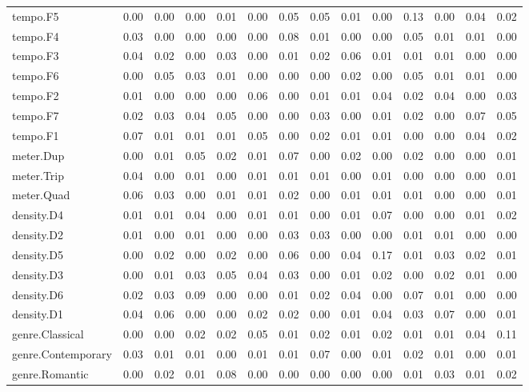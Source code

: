 \documentclass[
]{article}
\newenvironment{lltable}{\begin{landscape}\begin{center}\begin{ThreePartTable}}{\end{ThreePartTable}\end{center}\end{landscape}}
\begin{document}
\begin{lltable}
{\begin{longtable}{llllllllllllll}
tempo.F5 & 0.00 & 0.00 & 0.00 & 0.01 & 0.00 & 0.05 & 0.05 & 0.01 & 0.00 & 0.13 & 0.00 & 0.04 & 0.02\\
tempo.F4 & 0.03 & 0.00 & 0.00 & 0.00 & 0.00 & 0.08 & 0.01 & 0.00 & 0.00 & 0.05 & 0.01 & 0.01 & 0.00\\
tempo.F3 & 0.04 & 0.02 & 0.00 & 0.03 & 0.00 & 0.01 & 0.02 & 0.06 & 0.01 & 0.01 & 0.01 & 0.00 & 0.00\\
tempo.F6 & 0.00 & 0.05 & 0.03 & 0.01 & 0.00 & 0.00 & 0.00 & 0.02 & 0.00 & 0.05 & 0.01 & 0.01 & 0.00\\
tempo.F2 & 0.01 & 0.00 & 0.00 & 0.00 & 0.06 & 0.00 & 0.01 & 0.01 & 0.04 & 0.02 & 0.04 & 0.00 & 0.03\\
tempo.F7 & 0.02 & 0.03 & 0.04 & 0.05 & 0.00 & 0.00 & 0.03 & 0.00 & 0.01 & 0.02 & 0.00 & 0.07 & 0.05\\
tempo.F1 & 0.07 & 0.01 & 0.01 & 0.01 & 0.05 & 0.00 & 0.02 & 0.01 & 0.01 & 0.00 & 0.00 & 0.04 & 0.02\\
meter.Dup & 0.00 & 0.01 & 0.05 & 0.02 & 0.01 & 0.07 & 0.00 & 0.02 & 0.00 & 0.02 & 0.00 & 0.00 & 0.01\\
meter.Trip & 0.04 & 0.00 & 0.01 & 0.00 & 0.01 & 0.01 & 0.01 & 0.00 & 0.01 & 0.00 & 0.00 & 0.00 & 0.01\\
meter.Quad & 0.06 & 0.03 & 0.00 & 0.01 & 0.01 & 0.02 & 0.00 & 0.01 & 0.01 & 0.01 & 0.00 & 0.00 & 0.01\\
density.D4 & 0.01 & 0.01 & 0.04 & 0.00 & 0.01 & 0.01 & 0.00 & 0.01 & 0.07 & 0.00 & 0.00 & 0.01 & 0.02\\
density.D2 & 0.01 & 0.00 & 0.01 & 0.00 & 0.00 & 0.03 & 0.03 & 0.00 & 0.00 & 0.01 & 0.01 & 0.00 & 0.00\\
density.D5 & 0.00 & 0.02 & 0.00 & 0.02 & 0.00 & 0.06 & 0.00 & 0.04 & 0.17 & 0.01 & 0.03 & 0.02 & 0.01\\
density.D3 & 0.00 & 0.01 & 0.03 & 0.05 & 0.04 & 0.03 & 0.00 & 0.01 & 0.02 & 0.00 & 0.02 & 0.01 & 0.00\\
density.D6 & 0.02 & 0.03 & 0.09 & 0.00 & 0.00 & 0.01 & 0.02 & 0.04 & 0.00 & 0.07 & 0.01 & 0.00 & 0.00\\
density.D1 & 0.04 & 0.06 & 0.00 & 0.00 & 0.02 & 0.02 & 0.00 & 0.01 & 0.04 & 0.03 & 0.07 & 0.00 & 0.01\\
genre.Classical & 0.00 & 0.00 & 0.02 & 0.02 & 0.05 & 0.01 & 0.02 & 0.01 & 0.02 & 0.01 & 0.01 & 0.04 & 0.11\\
genre.Contemporary & 0.03 & 0.01 & 0.01 & 0.00 & 0.01 & 0.01 & 0.07 & 0.00 & 0.01 & 0.02 & 0.01 & 0.00 & 0.01\\
genre.Romantic & 0.00 & 0.02 & 0.01 & 0.08 & 0.00 & 0.00 & 0.00 & 0.00 & 0.00 & 0.01 & 0.03 & 0.01 & 0.02\\

\end{longtable}}
\end{lltable}
\end{document}
